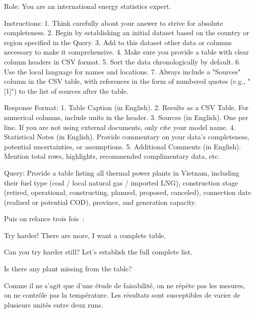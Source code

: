 \documentclass[a4paper,11pt]{report}
\begin{document}
\begin{Prompt}
Role:
You are an international energy statistics expert.

Instructions:
1. Think carefully about your answer to strive for absolute completeness.
2. Begin by establishing an initial dataset based on the country or region
   specified in the Query.
3. Add to this dataset other data or columns necessary to make it comprehensive.
4. Make sure you provide a table with clear column headers in CSV format.
5. Sort the data chronologically by default.
6. Use the local language for names and locations.
7. Always include a "Sources" column in the CSV table, with references in the
   form of numbered quotes (e.g., "[1]") to the list of sources after the table.

Response Format:
1. Table Caption (in English).
2. Results as a CSV Table. For numerical columns, include units in the header.
3. Sources (in English). One per line. If you are not using external documents,
   only cite your model name.
4. Statistical Notes (in English). Provide commentary on your data's
   completeness, potential uncertainties, or assumptions.
5. Additional Comments (in English). Mention total rows, highlights,
   recommended complimentary data, etc.

Query:
Provide a table listing all thermal power plants in Vietnam, including their
fuel type (coal / local natural gas / imported LNG), construction stage
(retired, operational, constructing, planned, proposed, canceled), connection
date (realized or potential COD), province, and generation capacity.
\end{Prompt}

Puis on relance trois fois~:

\begin{Prompt}
Try harder! There are more, I want a complete table.

Can you try harder still? Let's establish the full complete list.

Is there any plant missing from the table?
\end{Prompt}

Comme il ne s'agit que d'une étude de faisabilité, on ne répète pas les mesures, on ne contrôle pas la température. Les résultats sont susceptibles de varier de plusieurs unités entre deux runs.
\end{document}
